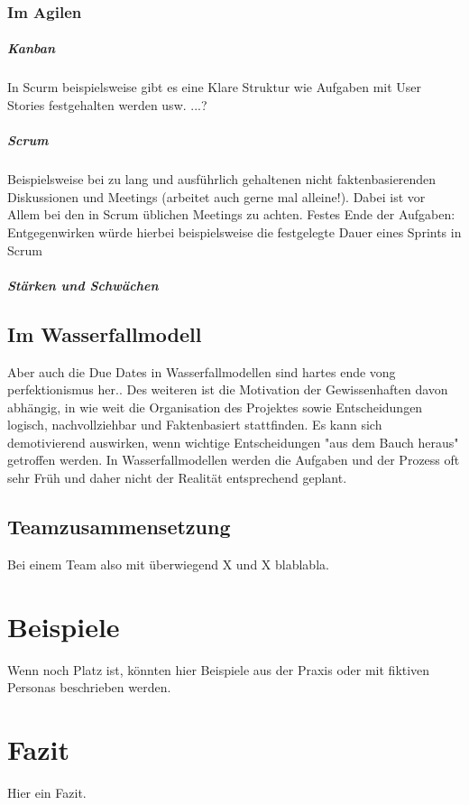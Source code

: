 \documentclass[twocolumn,10pt]{asme2ej}
\begin{document}
\subsubsection{Im Agilen}
\subparagraph{Kanban}
In Scurm beispielsweise gibt es eine Klare Struktur wie Aufgaben mit User Stories festgehalten werden usw. ...?
\subparagraph{Scrum}
Beispielsweise bei zu lang und ausführlich gehaltenen nicht faktenbasierenden Diskussionen und Meetings (arbeitet auch gerne mal alleine!). Dabei ist vor Allem bei den in Scrum üblichen Meetings zu achten. Festes Ende der Aufgaben: Entgegenwirken würde hierbei beispielsweise die festgelegte Dauer eines Sprints in Scrum

\subparagraph{Stärken und Schwächen}

\subsection{Im Wasserfallmodell}
Aber auch die Due Dates in Wasserfallmodellen sind hartes ende vong perfektionismus her.. Des weiteren ist die Motivation der Gewissenhaften davon abhängig, in wie weit die Organisation des Projektes sowie Entscheidungen logisch, nachvollziehbar und Faktenbasiert stattfinden. Es kann sich demotivierend auswirken, wenn wichtige Entscheidungen "aus dem Bauch heraus" getroffen werden. In Wasserfallmodellen werden die Aufgaben und der Prozess oft sehr Früh und daher nicht der Realität entsprechend geplant. 

\cite{disc_pm}
\subsection{Teamzusammensetzung}
Bei einem Team also mit überwiegend X und X blablabla.

\section{Beispiele}
Wenn noch Platz ist, könnten hier Beispiele aus der Praxis oder mit fiktiven Personas beschrieben werden.

\section{Fazit}
Hier ein Fazit.




\end{document}
